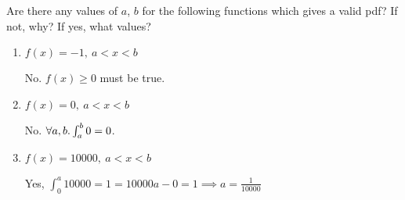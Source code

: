 \question Are there any values of $a$, $b$ for the following functions 
which gives a valid pdf? If not, why? If yes, what values?

\begin{enumerate}[label=(\alph*)]
\item $f(x) = -1,\ a < x < b$
\begin{solution}[1cm]
No. $f(x) \ge 0$ must be true.
\end{solution}
\item $f(x) = 0, \ a<x<b$ 
\begin{solution}[1cm]
No. $\forall a, b\ldotp \int_{a}^{b} 0 = 0$.
\end{solution}
\item $f(x) = 10000,\ a<x<b $
\begin{solution}[1cm]
Yes, $\int_{0}^{a} 10000 = 1 = 10000a - 0 = 1 \implies a = \frac{1}{10000}$
\end{solution}
\end{enumerate}